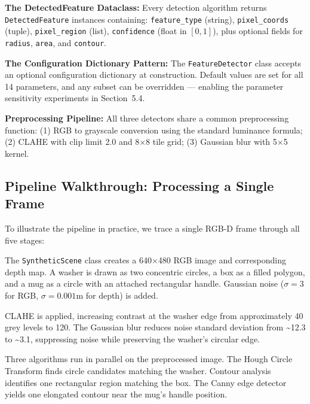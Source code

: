 \documentclass[11pt,a4paper]{article}
\begin{document}
\textbf{The DetectedFeature Dataclass:} Every detection algorithm returns \texttt{DetectedFeature} instances containing: \texttt{feature\_type} (string), \texttt{pixel\_coords} (tuple), \texttt{pixel\_region} (list), \texttt{confidence} (float in $[0,1]$), plus optional fields for \texttt{radius}, \texttt{area}, and \texttt{contour}.

\textbf{The Configuration Dictionary Pattern:} The \texttt{FeatureDetector} class accepts an optional configuration dictionary at construction. Default values are set for all 14 parameters, and any subset can be overridden --- enabling the parameter sensitivity experiments in Section~5.4.

\textbf{Preprocessing Pipeline:} All three detectors share a common preprocessing function: (1) RGB to grayscale conversion using the standard luminance formula; (2) CLAHE with clip limit 2.0 and 8$\times$8 tile grid; (3) Gaussian blur with 5$\times$5 kernel.

\subsection{Pipeline Walkthrough: Processing a Single Frame}

To illustrate the pipeline in practice, we trace a single RGB-D frame through all five stages:

\begin{stepbox}
The \texttt{SyntheticScene} class creates a 640$\times$480 RGB image and corresponding depth map. A washer is drawn as two concentric circles, a box as a filled polygon, and a mug as a circle with an attached rectangular handle. Gaussian noise ($\sigma\!=\!3$ for RGB, $\sigma\!=\!0.001$m for depth) is added.
\end{stepbox}

\begin{stepbox}
CLAHE is applied, increasing contrast at the washer edge from approximately 40 grey levels to 120. The Gaussian blur reduces noise standard deviation from \textasciitilde12.3 to \textasciitilde3.1, suppressing noise while preserving the washer's circular edge.
\end{stepbox}

\begin{stepbox}
Three algorithms run in parallel on the preprocessed image. The Hough Circle Transform finds circle candidates matching the washer. Contour analysis identifies one rectangular region matching the box. The Canny edge detector yields one elongated contour near the mug's handle position.
\end{stepbox}
\end{document}
